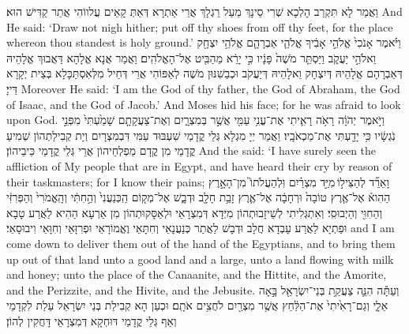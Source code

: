 {וַאֲמַר לָא תִּקְרַב הָלְכָא שְׁרִי סֵינָךְ מֵעַל רַגְלָךְ אֲרֵי אַתְרָא דְּאַתְּ קָאֵים עֲלווֹהִי אֲתַר קַדִּישׁ הוּא׃}
{And He said: ‘Draw not nigh hither; put off thy shoes from off thy feet, for the place whereon thou standest is holy ground.’}{}
{וַיֹּ֗אמֶר אָנֹכִי֙ אֱלֹהֵ֣י אָבִ֔יךָ אֱלֹהֵ֧י אַבְרָהָ֛ם אֱלֹהֵ֥י יִצְחָ֖ק וֵאלֹהֵ֣י יַעֲקֹ֑ב וַיַּסְתֵּ֤ר מֹשֶׁה֙ פָּנָ֔יו כִּ֣י יָרֵ֔א מֵהַבִּ֖יט אֶל־הָאֱלֹהִֽים׃}
{וַאֲמַר אֲנָא אֱלָהָא דַּאֲבוּךְ אֱלָהֵיהּ דְּאַבְרָהָם אֱלָהֵיהּ דְּיִצְחָק וֵאלָהֵיהּ דְּיַעֲקֹב וּכְבַשִׁנּוּן מֹשֶׁה לְאַפּוֹהִי אֲרֵי דְּחֵיל מִלְּאִסְתַּכָּלָא בְּצֵית יְקָרָא דַּייָ׃}
{Moreover He said: ‘I am the God of thy father, the God of Abraham, the God of Isaac, and the God of Jacob.’ And Moses hid his face; for he was afraid to look upon God.}{}
{וַיֹּ֣אמֶר יְהֹוָ֔ה רָאֹ֥ה רָאִ֛יתִי אֶת־עֳנִ֥י עַמִּ֖י אֲשֶׁ֣ר בְּמִצְרָ֑יִם וְאֶת־צַעֲקָתָ֤ם שָׁמַ֙עְתִּי֙ מִפְּנֵ֣י נֹֽגְשָׂ֔יו כִּ֥י יָדַ֖עְתִּי אֶת־מַכְאֹבָֽיו׃
}
{וַאֲמַר יְיָ מִגְלָא גְּלֵי קֳדָמַי שִׁעְבּוּד עַמִּי דִּבְמִצְרָיִם וְיָת קְבִילַתְהוֹן שְׁמִיעַ קֳדָמַי מִן קֳדָם מַפְלְחֵיהוֹן אֲרֵי גְּלֵי קֳדָמַי כֵּיבֵיהוֹן׃}
{And the \lord\space said: ‘I have surely seen the affliction of My people that are in Egypt, and have heard their cry by reason of their taskmasters; for I know their pains;}{}
{וָאֵרֵ֞ד לְהַצִּיל֣וֹ \legarmeh  מִיַּ֣ד מִצְרַ֗יִם וּֽלְהַעֲלֹתוֹ֮ מִן־הָאָ֣רֶץ הַהִוא֒ אֶל־אֶ֤רֶץ טוֹבָה֙ וּרְחָבָ֔ה אֶל־אֶ֛רֶץ זָבַ֥ת חָלָ֖ב וּדְבָ֑שׁ אֶל־מְק֤וֹם הַֽכְּנַעֲנִי֙ וְהַ֣חִתִּ֔י וְהָֽאֱמֹרִי֙ וְהַפְּרִזִּ֔י וְהַחִוִּ֖י וְהַיְבוּסִֽי׃}
{וְאִתְגְּלִיתִי לְשֵׁיזָבוּתְהוֹן מִיְּדָא דְּמִצְרָאֵי וּלְאַסָּקוּתְהוֹן מִן אַרְעָא הַהִיא לַאֲרַע טָבָא וּפַתְיָא לַאֲרַע עָבְדָא חֲלָב וּדְבָשׁ לַאֲתַר כְּנַעֲנָאֵי וְחִתָּאֵי וֶאֱמוֹרָאֵי וּפְרִזָּאֵי וְחִוָּאֵי וִיבוּסָאֵי׃}
{and I am come down to deliver them out of the hand of the Egyptians, and to bring them up out of that land unto a good land and a large, unto a land flowing with milk and honey; unto the place of the Canaanite, and the Hittite, and the Amorite, and the Perizzite, and the Hivite, and the Jebusite.}{}
{וְעַתָּ֕ה הִנֵּ֛ה צַעֲקַ֥ת בְּנֵי־יִשְׂרָאֵ֖ל בָּ֣אָה אֵלָ֑י וְגַם־רָאִ֙יתִי֙ אֶת־הַלַּ֔חַץ אֲשֶׁ֥ר מִצְרַ֖יִם לֹחֲצִ֥ים אֹתָֽם׃}
{וּכְעַן הָא קְבִילַת בְּנֵי יִשְׂרָאֵל עַלַת לִקְדָמַי וְאַף גְּלֵי קֳדָמַי דּוּחְקָא דְּמִצְרָאֵי דָּחֲקִין לְהוֹן׃}
